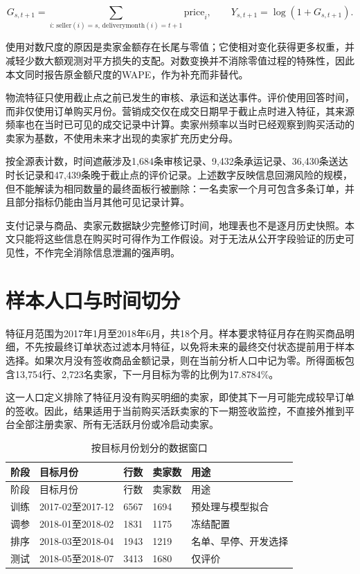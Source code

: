 \documentclass{sufethesismas}
\begin{document}
\[
G_{s,t+1}=\sum_{i:\,\mathrm{seller}(i)=s,\,
 \mathrm{deliverymonth}(i)=t+1}\mathrm{price}_i,\qquad
Y_{s,t+1}=\log(1+G_{s,t+1}).
\]

使用对数尺度的原因是卖家金额存在长尾与零值；它使相对变化获得更多权重，并减轻少数大额观测对平方损失的支配。对数变换并不消除零值过程的特殊性，因此本文同时报告原金额尺度的WAPE，作为补充而非替代。

物流特征只使用截止点之前已发生的审核、承运和送达事件。评价使用回答时间，而非仅使用订单购买月份。营销成交仅在成交日期早于截止点时进入特征，其来源频率也在当时已可见的成交记录中计算。卖家州频率以当时已经观察到购买活动的卖家为基数，不使用未来才出现的卖家扩充历史分母。

按全源表计数，时间遮蔽涉及1,684条审核记录、9,432条承运记录、36,430条送达时长记录和47,439条晚于截止点的评价记录。上述数字反映信息回溯风险的规模，但不能解读为相同数量的最终面板行被删除：一名卖家一个月可包含多条订单，并且部分指标仍能由当月其他可见记录计算。

支付记录与商品、卖家元数据缺少完整修订时间，地理表也不是逐月历史快照。本文只能将这些信息在购买时可得作为工作假设。对于无法从公开字段验证的历史可见性，不作完全消除信息泄漏的强声明。

\section{样本人口与时间切分}

特征月范围为2017年1月至2018年6月，共18个月。样本要求特征月存在购买商品明细，不先按最终订单状态过滤本月特征，以免将未来的最终交付状态提前用于样本选择。如果次月没有签收商品金额记录，则在当前分析人口中记为零。所得面板包含13,754行、2,723名卖家，下一月目标为零的比例为17.8784\%。

这一人口定义排除了特征月没有购买明细的卖家，即使其下一月可能完成较早订单的签收。因此，结果适用于当前购买活跃卖家的下一期签收监控，不直接外推到平台全部注册卖家、所有无活跃月份或冷启动卖家。

{
\footnotesize
\begin{longtable}[]{@{}lllll@{}}
\caption{按目标月份划分的数据窗口}\tabularnewline
\toprule\noalign{}
阶段 & 目标月份 & 行数 & 卖家数 & 用途 \\
\midrule\noalign{}
\endfirsthead
\toprule\noalign{}
阶段 & 目标月份 & 行数 & 卖家数 & 用途 \\
\midrule\noalign{}
\endhead
\bottomrule\noalign{}
\endlastfoot
训练 & 2017-02至2017-12 & 6567 & 1694 & 预处理与模型拟合 \\
调参 & 2018-01至2018-02 & 1831 & 1175 & 冻结配置 \\
排序 & 2018-03至2018-04 & 1943 & 1219 & 名单、早停、开发选择 \\
测试 & 2018-05至2018-07 & 3413 & 1680 & 仅评价 \\
\end{longtable}
}
\end{document}
